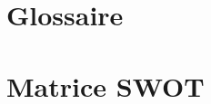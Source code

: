 \renewcommand{\contentsname}{Table des annexes}
\clearpage
\section{Glossaire}

\clearpage
\section{Matrice SWOT}

\clearpage
%
